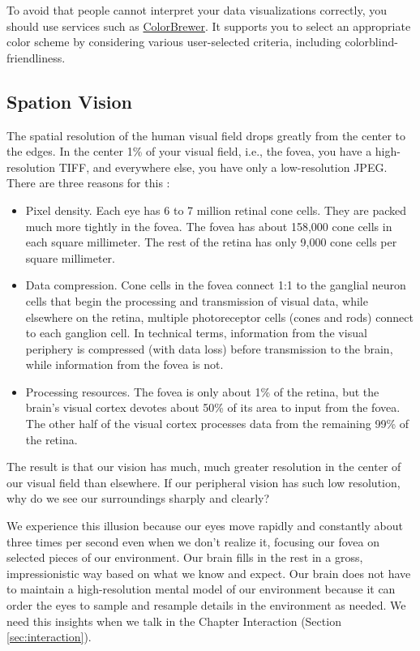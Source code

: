 \documentclass[
]{book}
\providecommand{\tightlist}{%
  \setlength{\itemsep}{0pt}\setlength{\parskip}{0pt}}
\begin{document}
To avoid that people cannot interpret your data visualizations correctly, you should use services such as \href{https://colorbrewer2.org}{ColorBrewer}. It supports you to select an appropriate color scheme by considering various user-selected criteria, including colorblind-friendliness.

\hypertarget{spation-vision}{%
\subsection{Spation Vision}\label{spation-vision}}

The spatial resolution of the human visual field drops greatly from the center to the edges. In the center 1\% of your visual field, i.e., the fovea, you have a high-resolution TIFF, and everywhere else, you have only a low-resolution JPEG. There are three reasons for this \citep{Johnson2014designingwiththemind}:

\begin{itemize}
\tightlist
\item
  Pixel density. Each eye has 6 to 7 million retinal cone cells. They are packed much more tightly in the fovea. The fovea has about 158,000 cone cells in each square millimeter. The rest of the retina has only 9,000 cone cells per square millimeter.
\item
  Data compression. Cone cells in the fovea connect 1:1 to the ganglial neuron cells that begin the processing and transmission of visual data, while elsewhere on the retina, multiple photoreceptor cells (cones and rods) connect to each ganglion cell. In technical terms, information from the visual periphery is compressed (with data loss) before transmission to the brain, while information from the fovea is not.
\item
  Processing resources. The fovea is only about 1\% of the retina, but the brain's visual cortex devotes about 50\% of its area to input from the fovea. The other half of the visual cortex processes data from the remaining 99\% of the retina.
\end{itemize}

The result is that our vision has much, much greater resolution in the center of our visual field than elsewhere. If our peripheral vision has such low resolution, why do we see our surroundings sharply and clearly?

We experience this illusion because our eyes move rapidly and constantly about three times per second even when we don't realize it, focusing our fovea on selected pieces of our environment. Our brain fills in the rest in a gross, impressionistic way based on what we know and expect. Our brain does not have to maintain a high-resolution mental model of our environment because it can order the eyes to sample and resample details in the environment as needed. We need this insights when we talk in the Chapter Interaction (Section \ref{sec:interaction}).
\end{document}

